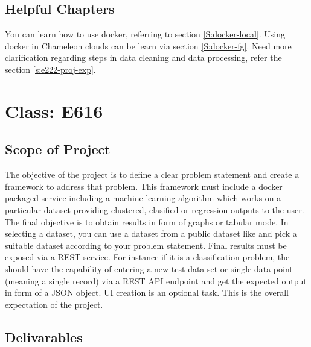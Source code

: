 \subsection{Helpful Chapters}

You can learn how to use docker, referring to section
\ref{S:docker-local}.  Using docker in Chameleon clouds can be learn
via section \ref{S:docker-fg}.  Need more clarification regarding
steps in data cleaning and data processing, refer the section
\ref{s:e222-proj-exp}.


\section{Class: E616}\label{s:e616-project}

\subsection{Scope of Project}

The objective of the project is to define a clear problem statement
and create a framework to address that problem. This framework must
include a docker packaged service including a machine learning
algorithm which works on a particular dataset providing clustered,
clasified or regression outputs to the user. The final objective is to
obtain results in form of graphs or tabular mode. In selecting a
dataset, you can use a dataset from a public dataset like
 and pick a suitable
dataset according to your problem statement. Final results must be
exposed via a REST service. For instance if it is a classification
problem, the should have the capability of entering a new test data
set or single data point (meaning a single record) via a REST API endpoint
and get the expected output in form of a JSON object. UI creation is an
optional task. This is the overall expectation of the project. 

\subsection{Delivarables}

